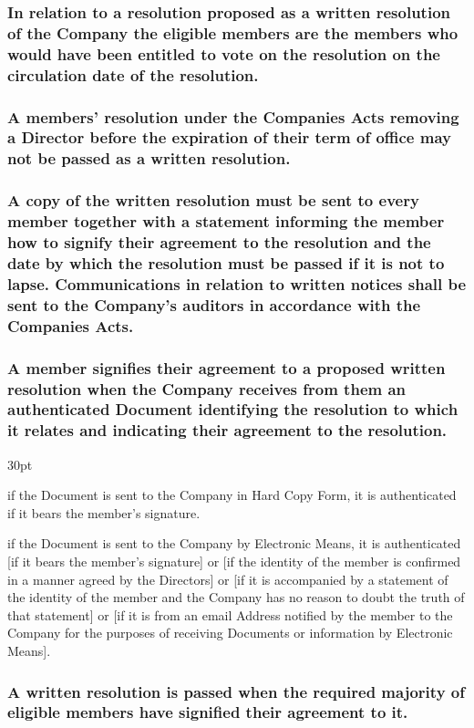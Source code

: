 \documentclass[12pt]{article}
\def\clauseindent{30pt}
\newenvironment{subindentpara}{\begin{adjustwidth}{\clauseindent}{}\begin{hanginglist}}{\end{hanginglist}\end{adjustwidth}}
\begin{document}
\subsubsection{In relation to a resolution proposed as a written resolution of the Company the eligible members are the members who would have been entitled to vote on the resolution on the circulation date of the resolution.}
\subsubsection{\label{subsubsection:WrittenResolutionException}A members' resolution under the Companies Acts removing a Director before the expiration of their term of office may not be passed as a written resolution.}
\subsubsection{A copy of the written resolution must be sent to every member together with a statement informing the member how to signify their agreement to the resolution and the date by which the resolution must be passed if it is not to lapse. Communications in relation to written notices shall be sent to the Company's auditors in accordance with the Companies Acts.}
\subsubsection{A member signifies their agreement to a proposed written resolution when the Company receives from them an authenticated Document identifying the resolution to which it relates and indicating their agreement to the resolution.}
\begin{subindentpara}
    \item if the Document is sent to the Company in Hard Copy Form, it is authenticated if it bears the member's signature.
    \item if the Document is sent to the Company by Electronic Means, it is authenticated [if it bears the member's signature] or [if the identity of the member is confirmed in a manner agreed by the Directors] or [if it is accompanied by a statement of the identity of the member and the Company has no reason to doubt the truth of that statement] or [if it is from an email Address notified by the member to the Company for the purposes of receiving Documents or information by Electronic Means].
\end{subindentpara}
\subsubsection{A written resolution is passed when the required majority of eligible members have signified their agreement to it.}
\end{document}

